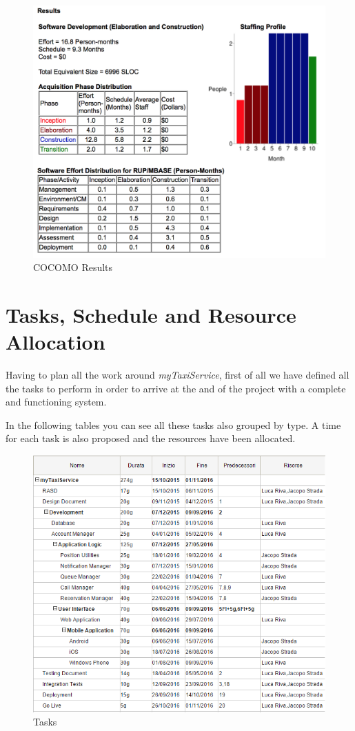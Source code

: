 \documentclass[a4paper]{article}
\begin{document}
\begin{figure}[H]
\includegraphics[width=.8\textwidth]{COCOMO-Results}
\centering
\caption{COCOMO Results}
\label{fig:COCOMO-Results}
\end{figure}

\section{Tasks, Schedule and Resource Allocation}

Having to plan all the work around \emph{myTaxiService}, first of all we have defined all the tasks to perform in order to arrive at the and of the project with a complete and functioning system.

In the following tables you can see all these tasks also grouped by type. A time for each task is also proposed and the resources have been allocated.

\vfill

\begin{figure}[H]
\includegraphics[width=.8\textwidth]{GANTT_TABLE}
\centering
\caption{Tasks}
\label{fig:GANTT_TABLE}
\end{figure}
\end{document}
